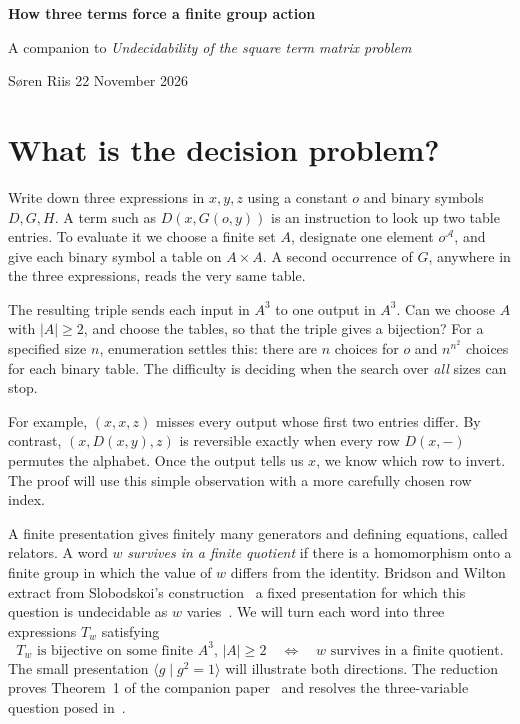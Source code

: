 \documentclass[a4paper,12pt]{article}
\newcommand{\fA}{\mathcal A}
\newcommand{\stephead}[1]{\par\smallskip{\large\bfseries\color{inkblue}#1}\par\nobreak}
\begin{document}
\thispagestyle{plain}
{\Large\bfseries How three terms force a finite group action\par}
{\large A companion to \emph{Undecidability of the square term matrix problem}\par}
{\small Søren Riis \hfill 22 November 2026\par}
\section{What is the decision problem?}\label{start}
Write down three expressions in \(x,y,z\) using a constant \(o\) and binary symbols \(D,G,H\). A term such as \(D(x,G(o,y))\) is an instruction to look up two table entries. To evaluate it we choose a finite set \(A\), designate one element \(o^\fA\), and give each binary symbol a table on \(A\times A\). A second occurrence of \(G\), anywhere in the three expressions, reads the very same table.

The resulting triple sends each input in \(A^3\) to one output in \(A^3\). Can we choose \(A\) with \(|A|\ge2\), and choose the tables, so that the triple gives a bijection? For a specified size \(n\), enumeration settles this: there are \(n\) choices for \(o\) and \(n^{n^2}\) choices for each binary table. The difficulty is deciding when the search over \emph{all} sizes can stop.

For example, \((x,x,z)\) misses every output whose first two entries differ. By contrast, \((x,D(x,y),z)\) is reversible exactly when every row \(D(x,-)\) permutes the alphabet. Once the output tells us \(x\), we know which row to invert. The proof will use this simple observation with a more carefully chosen row index.

\stephead{Why use group words?}
A finite presentation gives finitely many generators and defining equations, called relators. A word \(w\) \emph{survives in a finite quotient} if there is a homomorphism onto a finite group in which the value of \(w\) differs from the identity. Bridson and Wilton extract from Slobodskoi’s construction~\cite{Slobodskoi} a fixed presentation for which this question is undecidable as \(w\) varies~\cite[Theorem~2.1]{BW}. We will turn each word into three expressions \(T_w\) satisfying
\[
 \text{\(T_w\) is bijective on some finite \(A^3\), \(|A|\ge2\)}
 \quad\Longleftrightarrow\quad
 \text{\(w\) survives in a finite quotient.}
\]
The small presentation \(\langle g\mid g^2=1\rangle\) will illustrate both directions. The reduction proves Theorem~1 of the companion paper~\cite{Square} and resolves the three-variable question posed in~\cite[Problem~6.1]{TC}.
\end{document}
